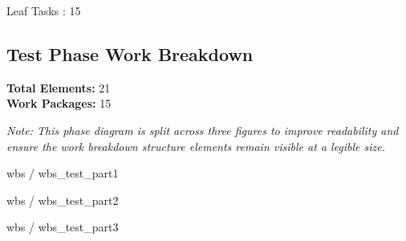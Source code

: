     Leaf Tasks : 15

\subsection {
  Test Phase Work Breakdown
}

\noindent\textbf { Total Elements: }
21
\\\textbf { Work Packages: }
15

\vspace {
  0.5em
}

\noindent\textit {
Note:
  This phase diagram is split across three figures to
      improve readability and ensure the work breakdown structure elements
          remain visible at a legible size.
}

 { wbs / wbs_test_part1 }

\newpage
 { wbs / wbs_test_part2 }

\newpage
 { wbs / wbs_test_part3 }


